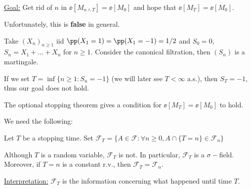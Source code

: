 \documentclass[../main.tex]{subfiles}
\begin{document}
\underline{Goal:} Get rid of $n$ in $\ee[M_{n \wedge T}] = \ee[M_0]$ and hope
that $\ee[M_T] = \ee[M_0]$.

Unfortunately, this is \textbf{false} in general.

\begin{example}
  Take $(X_n)_{n \geq 1}$ iid $\pp(X_1 = 1) = \pp(X_1 = -1) = 1/2 $ and $S_0 =
  0$, $S_n = X_1 + \ldots + X_n$ for $n \geq 1$. Consider the canonical
  filtration, then $(S_n)$ is a martingale.

  If we set $T = \inf \{ n \geq 1 \colon S_n = -1 \} $ (we will later see $T <
  \infty$ a.s.), then $S_T = -1$, thus our goal does not hold.
\end{example}

The optional stopping theorem gives a condition for $\ee[M_T] = \ee[M_0]$ to
hold.

\vspace{0.3em}
We need the following:
\begin{definition}
    Let $T$ be a stopping time. Set $\mathcal{F}_T = \{ A \in \mathcal{F} \colon
    \forall n \geq 0, A \cap \{ T = n \} \in \mathcal{F}_n\} $
\end{definition}
\begin{remark}
    Although $T$ is a random variable, $\mathcal{F}_T$ is not. In particular,
    $\mathcal{F}_T$ is a $\sigma-$field. Moreover, if $T = n$ is a constant
    r.v., then $\mathcal{F}_T = \mathcal{F}_n$.
\end{remark}    

\noindent
\underline{Interpretation:} $\mathcal{F}_T$ is the information concerning what
happened until time $T$.
\end{document}
